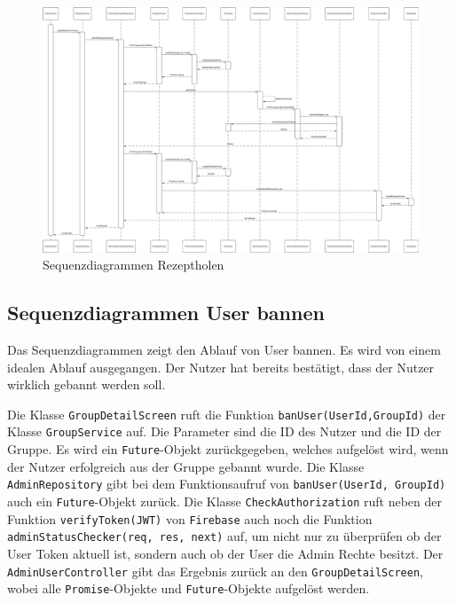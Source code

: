\documentclass{entwurfsheft}
\begin{document}
\begin{sloppypar}
        \begin{figure}[htp]
            \centering
            \includegraphics[width = \linewidth]{images/processDescription/SequenzdiagrammRecipeFetching.pdf}
            \caption{Sequenzdiagrammen Rezeptholen}
        \end{figure}

    \newpage
    
    \subsection{Sequenzdiagrammen User bannen}
        Das Sequenzdiagrammen zeigt den Ablauf von User bannen. Es wird von einem idealen Ablauf ausgegangen. Der Nutzer hat bereits bestätigt, dass der Nutzer wirklich gebannt werden soll.

        Die Klasse \texttt{GroupDetailScreen} ruft die Funktion \texttt{banUser(UserId,GroupId)} der Klasse \texttt{Group\-Service} auf. Die Parameter sind die ID des Nutzer und die ID der Gruppe. Es wird ein \texttt{Future}-Objekt zurückgegeben, welches aufgelöst wird, wenn der Nutzer erfolgreich aus der Gruppe gebannt wurde. Die Klasse \texttt{AdminRepository} gibt bei dem Funktionsaufruf von \texttt{banUser(UserId, GroupId)} auch ein \texttt{Future}-Objekt zurück. Die Klasse \texttt{CheckAuthorization} ruft neben der Funktion \texttt{verifyToken(JWT)} von \texttt{Firebase} auch noch die Funktion \texttt{adminStatusChecker(req, res, next)} auf, um nicht nur zu überprüfen ob der User Token aktuell ist, sondern auch ob der User die Admin Rechte besitzt. Der \texttt{AdminUserController} gibt das Ergebnis zurück an den \texttt{GroupDetailScreen}, wobei alle \texttt{Promise}-Objekte und \texttt{Future}-Objekte aufgelöst werden.


\end{sloppypar}
\end{document}
